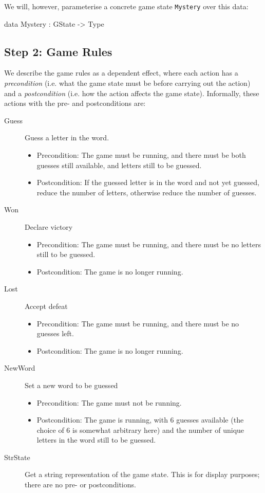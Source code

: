 We will, however, parameterise a concrete game state \texttt{Mystery} over
this data:

\begin{code}
data Mystery : GState -> Type
\end{code}

\subsection{Step 2: Game Rules}

We describe the game rules as a dependent effect, where each action
has a \emph{precondition} (i.e. what the game state must be before carrying
out the action) and a \emph{postcondition} (i.e. how the action affects
the game state). Informally, these actions with the pre- and postconditions are:

\begin{description}
\item[Guess] Guess a letter in the word.
\begin{itemize}
\item Precondition: The game must be running, and there must be 
both guesses still available, and letters still to be guessed.
\item Postcondition: If the guessed letter is in the word and not yet guessed,
reduce the number of letters, otherwise reduce the number of guesses.
\end{itemize}
\item[Won] Declare victory 
\begin{itemize}
\item Precondition: The game must be running, and there must be no letters
still to be guessed.
\item Postcondition: The game is no longer running.
\end{itemize}
\item[Lost] Accept defeat
\begin{itemize}
\item Precondition: The game must be running, and there must be no guesses left.
\item Postcondition: The game is no longer running.
\end{itemize}
\item[NewWord] Set a new word to be guessed 
\begin{itemize}
\item Precondition: The game must not be running.
\item Postcondition: The game is running, with 6 guesses available (the choice
of 6 is somewhat arbitrary here) and the number of unique letters in the word
still to be guessed.
\end{itemize}
\item[StrState] Get a string representation of the game state. This is for
display purposes; there are no pre- or postconditions.
\end{description}

